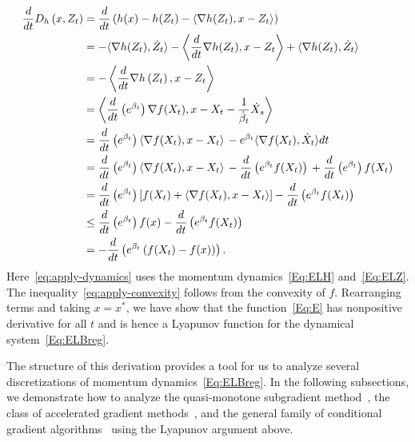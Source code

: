 \documentclass[11pt]{article}
\theoremstyle{plain}
\begin{document}
\begin{subequations}\label{Eq:LyapAnal}
\begin{align}
 \frac{d}{dt}D_h\left(x, Z_t\right)  &= \frac{d}{dt}\left( h(x) - h(Z_t) - \langle \nabla h(Z_t), x- Z_t\rangle \right) \notag\\
& = - \langle \nabla h(Z_t), \dot Z_t\rangle -\left\langle \frac{d}{dt} \nabla h(Z_t),x - Z_t\right\rangle  + \langle \nabla h(Z_t), \dot Z_t\rangle \notag\\ 
 &= - \left\langle \frac{d}{dt} \nabla h\left(Z_t\right), x - Z_t\right\rangle \, \notag\\%
&=    \left\langle \frac{d}{dt}\left(e^{\beta_t}\right)\nabla f(X_t), x  - X_{t} - \frac{1}{\dot \beta_t} \dot X_{s} \right\rangle  \, \label{eq:apply-dynamics}   \\
& =  \frac{d}{dt}\left(e^{\beta_t}\right) \langle \nabla f(X_t), x - X_t \rangle\, - e^{ \beta_t} \langle \nabla f(X_t), \dot X_t\rangle dt\, \notag   \\
& = \frac{d}{dt} \left(e^{\beta_t}\right) \langle \nabla f(X_t), x - X_t \rangle\,  -  \frac{d}{dt} \left(e^{ \beta_t} f(X_t)\right)\,   + \frac{d}{dt} \left(e^{\beta_t}\right)  f(X_t)  \notag\\
&= \frac{d}{dt}\left( e^{\beta_t}\right) [f(X_t)+ \langle \nabla f(X_t), x - X_t \rangle] -\frac{d}{dt} \left(e^{ \beta_t} f(X_t)\right)\,  \notag  \\ %
& \leq   \frac{d}{dt}\left( e^{\beta_t}\right) f(x) - \frac{d}{dt} \left(e^{ \beta_t} f(X_t)\right)\, \label{eq:apply-convexity}\\
& = - \frac{d}{dt} \left(e^{\beta_t}\left(f(X_t) - f(x)\right)\right) \label{Eq:cond1}.
\end{align}
\end{subequations}
Here~\eqref{eq:apply-dynamics} uses the momentum dynamics~\eqref{Eq:ELH} and~\eqref{Eq:ELZ}. The inequality~\eqref{eq:apply-convexity} follows from the convexity of $f$. Rearranging terms and taking $x = x^\ast$, we have show that the function~\eqref{Eq:E} has nonpositive derivative for all $t$ and is hence a Lyapunov function for the dynamical system~\eqref{Eq:ELBreg}.

 The structure of this derivation provides a tool for us to analyze several discretizations of momentum dynamics~\eqref{Eq:ELBreg}.
 In the following subsections, we demonstrate how to analyze the quasi-monotone subgradient method~\cite{Nesterov15}, the class of accelerated gradient methods~\cite{Baes09,Acceleration}, and the general family of conditional gradient algorithms~\cite{NesterovCond15} using the Lyapunov argument above.
\end{document}
